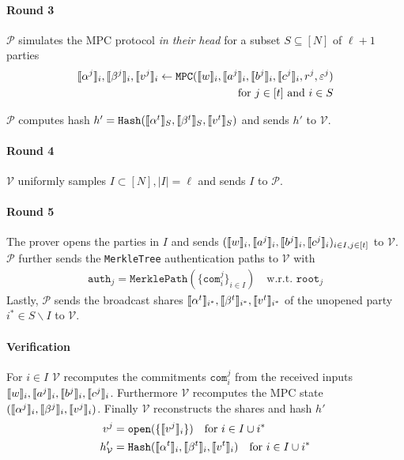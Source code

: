\documentclass[11pt]{report}
\theoremstyle{definition}
\theoremstyle{plain}
\begin{document}
\begin{protocol}
  \paragraph{Round 3} $\mathcal{P}$ simulates the MPC protocol \textit{in their head} for a subset $S \subseteq [N]$ of $\ell + 1$ parties
  \begin{align*}
    \llbracket \alpha^j \rrbracket_i, \llbracket \beta^j \rrbracket_i, \llbracket v^j \rrbracket_i \leftarrow \texttt{MPC}(\llbracket w \rrbracket_i, \llbracket a^j \rrbracket_i, \llbracket b^j \rrbracket_i,  \llbracket c^j \rrbracket_i, r^j, \varepsilon^j) \\ \text{for }j \in [t] \text{ and } i \in S
  \end{align*}

  $\mathcal{P}$ computes hash $h' = \texttt{Hash}(\llbracket \alpha^t \rrbracket_S, \llbracket \beta^t \rrbracket_S, \llbracket v^t \rrbracket_S)$ and sends $h'$ to $\mathcal{V}$.

  \paragraph{Round 4} $\mathcal{V}$ uniformly samples $I \subset [N], |I| = \ell$ and sends $I$ to $\mathcal{P}$.

  \paragraph{Round 5}
  The prover opens the parties in $I$ and sends $(\llbracket w \rrbracket_i, \llbracket a^j \rrbracket_i, \llbracket b^j \rrbracket_i, \llbracket c^j \rrbracket_i)_{i \in I, j \in [t]}$ to $\mathcal{V}$. $\mathcal{P}$ further sends the \texttt{MerkleTree} authentication paths to $\mathcal{V}$ with
  \begin{align*}
    \texttt{auth}_j = \texttt{MerklePath}(\{\texttt{com}^j_i\}_{i \in I}) \quad \text{w.r.t. }\texttt{root}_j
  \end{align*}
  Lastly, $\mathcal{P}$ sends the broadcast shares $\llbracket \alpha^t \rrbracket_{i^*}, \llbracket \beta^t \rrbracket_{i^*}, \llbracket v^t \rrbracket_{i^*}$ of the unopened party $i^* \in S \backslash I$ to $\mathcal{V}$.

  \paragraph{Verification}
  For $i \in I$ $\mathcal{V}$ recomputes the commitments $\texttt{com}^j_i$ from the received inputs \\$\llbracket w \rrbracket_i, \llbracket a^j \rrbracket_i, \llbracket b^j \rrbracket_i, \llbracket c^j \rrbracket_i$. Furthermore $\mathcal{V}$ recomputes the MPC state $ (\llbracket \alpha^j \rrbracket_i, \llbracket \beta^j \rrbracket_i, \llbracket v^j \rrbracket_i)$. Finally $\mathcal{V}$ reconstructs the shares and hash $h'$
    \begin{align*}
      v^j              & = \texttt{open}(\{\llbracket v^j \rrbracket_i\}) \quad \text{for } i \in I \cup i^*                              \\
      h'_{\mathcal{V}} & = \texttt{Hash}(\llbracket \alpha^t \rrbracket_i, \llbracket \beta^t \rrbracket_i, \llbracket v^t \rrbracket_i) \quad \text{for } i \in I \cup i^*
    \end{align*}


\end{protocol}
\end{document}
